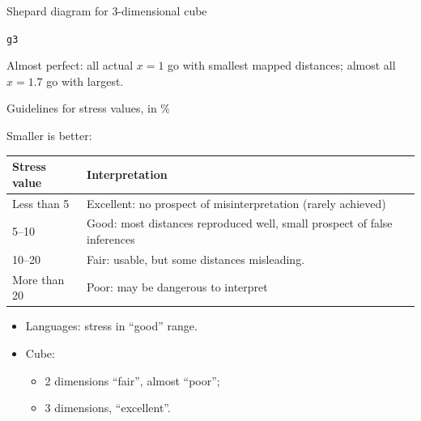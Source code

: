 \documentclass[unknownkeysallowed]{beamer}\usepackage[]{graphicx}\usepackage[]{color}
\makeatletter
\newcommand{\hlstd}[1]{\textcolor[rgb]{0.345,0.345,0.345}{#1}}%
\newenvironment{kframe}{%
 \def\at@end@of@kframe{}%
 \ifinner\ifhmode%
  \def\at@end@of@kframe{\end{minipage}}%
  \begin{minipage}{\columnwidth}%
 \fi\fi%
 \def\FrameCommand##1{\hskip\@totalleftmargin \hskip-\fboxsep
 \colorbox{shadecolor}{##1}\hskip-\fboxsep
     \hskip-\linewidth \hskip-\@totalleftmargin \hskip\columnwidth}%
 \MakeFramed {\advance\hsize-\width
   \@totalleftmargin\z@ \linewidth\hsize
   \@setminipage}}%
 {\par\unskip\endMakeFramed%
 \at@end@of@kframe}
\newenvironment{knitrout}{}{} %
\makeatother
\begin{document}
\begin{frame}[fragile]{Shepard diagram for 3-dimensional cube}
  
\begin{knitrout}
\color{fgcolor}\begin{kframe}
\begin{alltt}
\hlstd{g3}
\end{alltt}


{\ttfamily\noindent\bfseries\color{errorcolor}{\#\# Error in eval(expr, envir, enclos): object 'g3' not found}}\end{kframe}
\end{knitrout}
  
Almost perfect: all actual $x=1$ go with smallest mapped distances; almost
all $x=1.7$ go with  largest.
\end{frame}

\begin{frame}[fragile]{Guidelines for stress values, in \%}

Smaller is better:


\begin{tabular}{lp{3in}}
  Stress value & Interpretation \\
  \hline
  Less than 5 & Excellent: no prospect of misinterpretation (rarely achieved)\\
  5--10 & Good: most distances reproduced well, small prospect of false inferences\\
10--20 & Fair: usable, but some distances misleading.\\
More than 20 & Poor: may be dangerous to interpret\\
\hline
\end{tabular}

\begin{itemize}
\item Languages: stress in ``good'' range.
\item Cube: 
  \begin{itemize}
  \item   2 dimensions ``fair'', almost ``poor'';
  \item 3 dimensions, ``excellent''.
  \end{itemize}
\end{itemize}


\end{frame}
\end{document}
